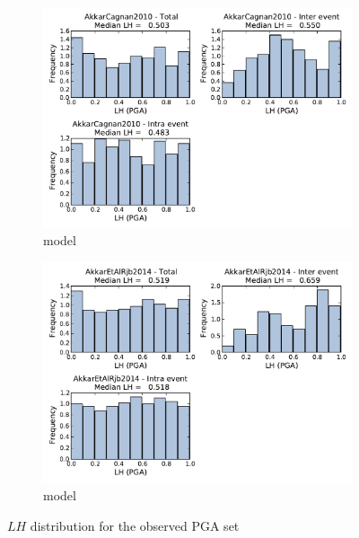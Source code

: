\begin{figure}[htb]
\begin{subfigure}[b]{0.49\textwidth}
      \includegraphics[width=\textwidth]{./figures/residuals/AC2010_LH_PGA.pdf}
      \caption{\textcite{AkkarCagnan2010} model}
      \label{fig:pga_lh_ac2010}
  \end{subfigure}
      \begin{subfigure}[b]{0.49\textwidth}
      \includegraphics[width=\textwidth]{./figures/residuals/Akkar2014_LH_PGA.pdf}
     \caption{\textcite{Akkar_etal2014} model}
      \label{fig:pga_lh_akkar2014}
  \end{subfigure}
  \caption{$LH$ distribution for the observed PGA set}
  \label{fig:pga_lh}
\end{figure}

